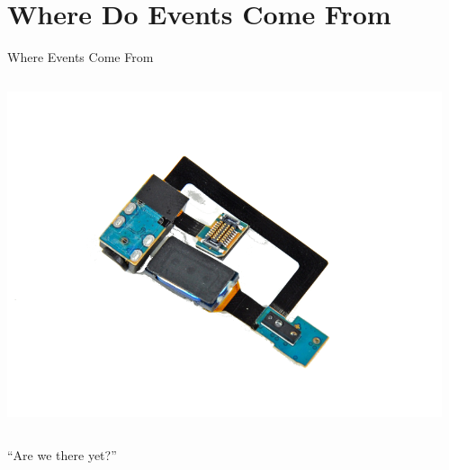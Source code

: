 \documentclass[aspectratio=169]{beamer}
\begin{document}
\section*{Where Do Events Come From}



\begin{frame}{Where Events Come From}
\begin{columns}
\begin{column}{0.5\textwidth}
\includegraphics[width=1.05\textwidth]{img/Galaxy_S_4G_037-small.png}

\vspace*{-1em}
\end{column}
\begin{column}{0.5\textwidth}
\end{column}
\end{columns}

\end{frame}



\begin{frame}
\Huge
\begin{center}
``Are we there yet?''
\end{center}

\end{frame}
\end{document}
